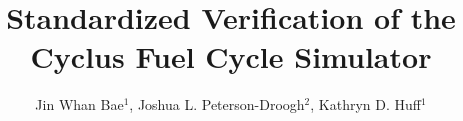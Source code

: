 \documentclass[review]{elsarticle}
\begin{document}
\begin{frontmatter}
\title{Standardized Verification of the Cyclus Fuel Cycle Simulator}
\author{Jin Whan Bae$^{1}$, Joshua L. Peterson-Droogh$^{2}$, Kathryn D. Huff$^{1}$}
\address{$^{1}$Dept. of Nuclear, Plasma, and Radiological Engineering, University of Illinois at Urbana-Champaign, Urbana, IL \\ $^{2}$Oak Ridge National Laboratory, Oak Ridge, TN }



\end{frontmatter}

\modulolinenumbers[5]
\linenumbers
	









\end{document}
